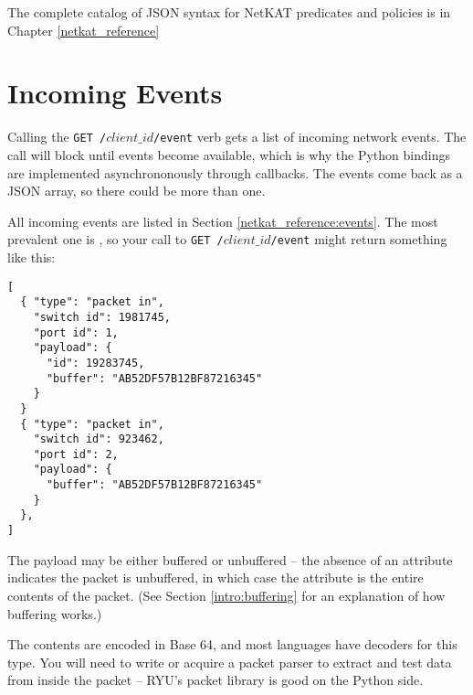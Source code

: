 The complete catalog of JSON syntax for NetKAT predicates and policies is in Chapter 
\ref{netkat_reference}

\section{Incoming Events}

Calling the \texttt{GET /$client\_id$/event} verb gets a list of incoming network events.
The call will block until events become available, which is why the Python bindings are 
implemented asynchrononously through callbacks.   The events come back as a 
JSON array, so there could be more than one.

All incoming events are listed in Section \ref{netkat_reference:events}.  The most
prevalent one is , so your call to \texttt{GET /$client\_id$/event} might
return something like this:

\begin{verbatim}
[
  { "type": "packet in", 
    "switch id": 1981745, 
    "port id": 1, 
    "payload": {
      "id": 19283745, 
      "buffer": "AB52DF57B12BF87216345" 
    }
  }
  { "type": "packet in", 
    "switch id": 923462, 
    "port id": 2, 
    "payload": {
      "buffer": "AB52DF57B12BF87216345" 
    }
  },
]
\end{verbatim}

The payload may be either buffered or unbuffered -- the absence of an  attribute 
indicates the packet is unbuffered, in which case the  attribute is the entire
contents of the packet.  (See Section \ref{intro:buffering} for an explanation of how buffering
works.)

The contents are encoded in Base 64, and most languages have decoders for this type.  You will
need to write or acquire a packet parser to extract and test data from inside the packet -- RYU's
packet library is good on the Python side. 
